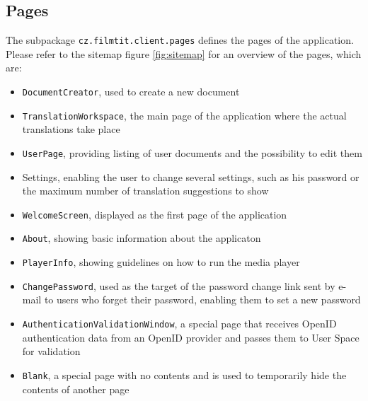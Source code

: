 \subsection{Pages}

The subpackage {\tt cz.filmtit.client.pages} defines the pages of the application.
Please refer to the sitemap figure \ref{fig:sitemap} for an overview of the pages, which are:

\begin{itemize}
\item {\tt DocumentCreator}, used to create a new document
\item {\tt TranslationWorkspace}, the main page of the application where the actual translations take place
\item {\tt UserPage}, providing listing of user documents and the possibility to edit them
\item Settings, enabling the user to change several settings, such as his password or the maximum number of translation suggestions to show
\item {\tt WelcomeScreen}, displayed as the first page of the application
\item {\tt About}, showing basic information about the applicaton
\item {\tt PlayerInfo}, showing guidelines on how to run the media player
\item {\tt ChangePassword}, used as the target of the password change link sent by e-mail to users who forget their password, enabling them to set a new password
\item {\tt AuthenticationValidationWindow}, a special page that receives OpenID authentication data from an OpenID provider and passes them to User Space for validation
\item {\tt Blank}, a special page with no contents and is used to temporarily hide the contents of another page
\end{itemize}

